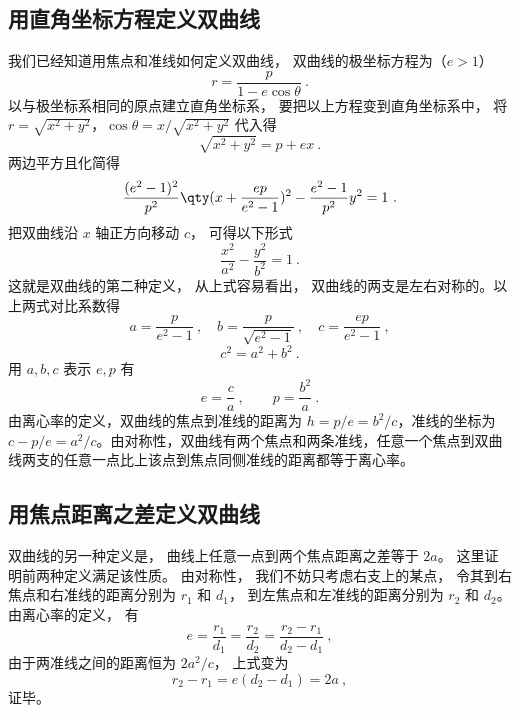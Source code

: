 


\subsection{用直角坐标方程定义双曲线}
我们已经知道用焦点和准线如何定义双曲线， 双曲线的极坐标方程为（$e>1$）
\begin{equation}
r = \frac{p}{1 - e\cos \theta }~.
\end{equation}
以与极坐标系相同的原点建立直角坐标系， 要把以上方程变到直角坐标系中， 将$r = \sqrt{x^2 + y^2}$，$\cos \theta  = x/\sqrt{x^2 + y^2}$ 代入得
\begin{equation}
\sqrt{x^2 + y^2}  = p + ex~.
\end{equation}
两边平方且化简得
\begin{equation}
\frac{(e^2 - 1)^2}{p^2} \qty(x + \frac{ep}{e^2 - 1} )^2 - \frac{e^2 - 1}{p^2} y^2 = 1~.
\end{equation}
把双曲线沿 $x$ 轴正方向移动 $c$， 可得以下形式
\begin{equation}\label{eq_Hypb3_4}
\frac{x^2}{a^2} - \frac{y^2}{b^2} = 1~.
\end{equation}
这就是双曲线的第二种定义， 从上式容易看出， 双曲线的两支是左右对称的。以上两式对比系数得
\begin{equation}
a = \frac{p}{e^2 - 1}~, \quad  b = \frac{p}{\sqrt{e^2 - 1} }~, \quad c = \frac{ep}{e^2 - 1}~,
\end{equation}
\begin{equation}
c^2 = a^2 + b^2~.
\end{equation}
用 $a, b, c$ 表示 $e,p$ 有
\begin{equation}
e = \frac{c}{a} ~,\qquad p = \frac{b^2}{a}~.
\end{equation}
由离心率的定义，双曲线的焦点到准线的距离为 $h = p/e=b^2/c$，准线的坐标为 $c-p/e = a^2/c$。由对称性，双曲线有两个焦点和两条准线，任意一个焦点到双曲线两支的任意一点比上该点到焦点同侧准线的距离都等于离心率。

\subsection{用焦点距离之差定义双曲线}
双曲线的另一种定义是， 曲线上任意一点到两个焦点距离之差等于 $2a$。 这里证明前两种定义满足该性质。 由对称性， 我们不妨只考虑右支上的某点， 令其到右焦点和右准线的距离分别为 $r_1$ 和 $d_1$， 到左焦点和左准线的距离分别为 $r_2$ 和 $d_2$。 由离心率的定义， 有
\begin{equation}
e = \frac{r_1}{d_1} = \frac{r_2}{d_2} = \frac{r_2 - r_1}{d_2 - d_1}~,
\end{equation}
由于两准线之间的距离恒为 $2a^2/c$， 上式变为
\begin{equation}
r_2 - r_1 = e(d_2 - d_1) = 2a~,
\end{equation}
证毕。

